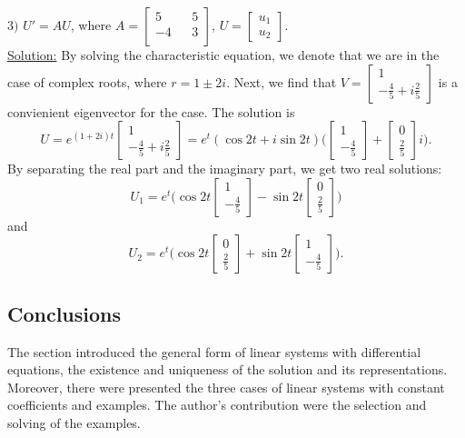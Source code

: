 \documentclass[a4paper,11pt]{report}
\begin{document}
$3)$ $U'=AU$, where $A=\begin{bmatrix}
                    5 && 5\\
                    -4 && 3\\
                   \end{bmatrix}$, $U=\begin{bmatrix} u_{1} \\ u_{2}\end{bmatrix}$.\\
    \underline{Solution:}
    By solving the characteristic equation, we denote that we are in the case of complex roots, where $r=1\pm2i$. Next, we find that $V=\begin{bmatrix} 1 \\ -\frac{4}{5}+i\frac{2}{5} \end{bmatrix}$ is a convienient eigenvector for the case. The solution is 
    $$ U=e^{(1+2i)t}\begin{bmatrix} 1 \\ -\frac{4}{5}+i\frac{2}{5} \end{bmatrix} 
    = e^{t}(\cos{2t}+i\sin{2t})\bigg( \begin{bmatrix} 1\\ -\frac{4}{5}\end{bmatrix} + \begin{bmatrix} 0\\ \frac{2}{5}\end{bmatrix} i \bigg).$$
    By separating the real part and the imaginary part, we get two real solutions:
    $$U_{1}=e^{t}\bigg( \cos{2t}  \begin{bmatrix} 1\\ -\frac{4}{5}\end{bmatrix} - \sin{2t} \begin{bmatrix} 0\\ \frac{2}{5}\end{bmatrix} \bigg) $$ and
    $$ U_{2}=e^{t}\bigg( \cos{2t} \begin{bmatrix} 0\\ \frac{2}{5}\end{bmatrix} + \sin{2t} \begin{bmatrix} 1\\ -\frac{4}{5}\end{bmatrix} \bigg).$$
    
    \subsection{Conclusions}
    The section introduced the general form of linear systems with differential equations, the existence and uniqueness of the solution and its representations. Moreover, there were presented the three cases of linear systems with constant coefficients and examples. The author's contribution were the selection and solving of the examples.
    
\end{document}
